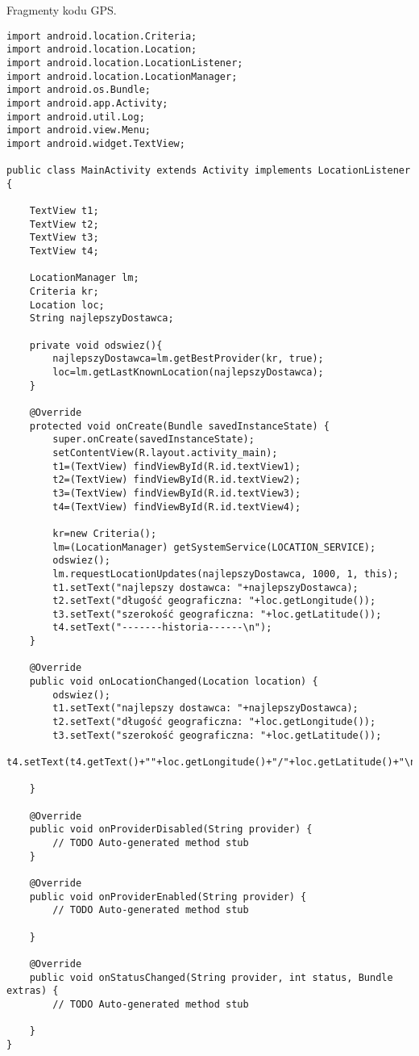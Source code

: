 
Fragmenty kodu GPS.
\begin{lstlisting}
import android.location.Criteria;
import android.location.Location;
import android.location.LocationListener;
import android.location.LocationManager;
import android.os.Bundle;
import android.app.Activity;
import android.util.Log;
import android.view.Menu;
import android.widget.TextView;

public class MainActivity extends Activity implements LocationListener {

	TextView t1;
	TextView t2;
	TextView t3;
	TextView t4;
	
	LocationManager lm;
	Criteria kr;
	Location loc;
	String najlepszyDostawca;
	
	private void odswiez(){
		najlepszyDostawca=lm.getBestProvider(kr, true);	
		loc=lm.getLastKnownLocation(najlepszyDostawca);		
	}
	
	@Override
	protected void onCreate(Bundle savedInstanceState) {
		super.onCreate(savedInstanceState);
		setContentView(R.layout.activity_main);
		t1=(TextView) findViewById(R.id.textView1);
		t2=(TextView) findViewById(R.id.textView2);
		t3=(TextView) findViewById(R.id.textView3);
		t4=(TextView) findViewById(R.id.textView4);
		
		kr=new Criteria();
		lm=(LocationManager) getSystemService(LOCATION_SERVICE);
		odswiez();				
		lm.requestLocationUpdates(najlepszyDostawca, 1000, 1, this);
		t1.setText("najlepszy dostawca: "+najlepszyDostawca);
		t2.setText("długość geograficzna: "+loc.getLongitude());
		t3.setText("szerokość geograficzna: "+loc.getLatitude());
		t4.setText("-------historia------\n");
	}

	@Override
	public void onLocationChanged(Location location) {
		odswiez();
		t1.setText("najlepszy dostawca: "+najlepszyDostawca);
		t2.setText("długość geograficzna: "+loc.getLongitude());
		t3.setText("szerokość geograficzna: "+loc.getLatitude());
		t4.setText(t4.getText()+""+loc.getLongitude()+"/"+loc.getLatitude()+"\n");
		
	}

	@Override
	public void onProviderDisabled(String provider) {
		// TODO Auto-generated method stub		
	}

	@Override
	public void onProviderEnabled(String provider) {
		// TODO Auto-generated method stub
		
	}

	@Override
	public void onStatusChanged(String provider, int status, Bundle extras) {
		// TODO Auto-generated method stub
		
	}
}
\end{lstlisting}

